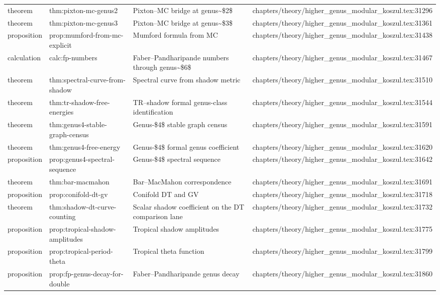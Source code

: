 \documentclass[11pt]{article}
\begin{document}
\begin{longtable}{L{0.10\textwidth}L{0.26\textwidth}L{0.42\textwidth}L{0.22\textwidth}}
theorem & thm:pixton-mc-genus2 & Pixton--MC bridge at genus\textasciitilde{}\$2\$ & chapters/theory/higher\_genus\_modular\_koszul.tex:31296\\
theorem & thm:pixton-mc-genus3 & Pixton--MC bridge at genus\textasciitilde{}\$3\$ & chapters/theory/higher\_genus\_modular\_koszul.tex:31361\\
proposition & prop:mumford-from-mc-explicit & Mumford formula from MC & chapters/theory/higher\_genus\_modular\_koszul.tex:31438\\
calculation & calc:fp-numbers & Faber--Pandharipande numbers through genus\textasciitilde{}\$6\$ & chapters/theory/higher\_genus\_modular\_koszul.tex:31467\\
theorem & thm:spectral-curve-from-shadow & Spectral curve from shadow metric & chapters/theory/higher\_genus\_modular\_koszul.tex:31510\\
theorem & thm:tr-shadow-free-energies & TR--shadow formal genus-class identification & chapters/theory/higher\_genus\_modular\_koszul.tex:31544\\
theorem & thm:genus4-stable-graph-census & Genus-\$4\$ stable graph census & chapters/theory/higher\_genus\_modular\_koszul.tex:31591\\
theorem & thm:genus4-free-energy & Genus-\$4\$ formal genus coefficient & chapters/theory/higher\_genus\_modular\_koszul.tex:31620\\
proposition & prop:genus4-spectral-sequence & Genus-\$4\$ spectral sequence & chapters/theory/higher\_genus\_modular\_koszul.tex:31642\\
theorem & thm:bar-macmahon & Bar--MacMahon correspondence & chapters/theory/higher\_genus\_modular\_koszul.tex:31691\\
proposition & prop:conifold-dt-gv & Conifold DT and GV & chapters/theory/higher\_genus\_modular\_koszul.tex:31718\\
theorem & thm:shadow-dt-curve-counting & Scalar shadow coefficient on the DT comparison lane & chapters/theory/higher\_genus\_modular\_koszul.tex:31732\\
proposition & prop:tropical-shadow-amplitudes & Tropical shadow amplitudes & chapters/theory/higher\_genus\_modular\_koszul.tex:31775\\
proposition & prop:tropical-period-theta & Tropical theta function & chapters/theory/higher\_genus\_modular\_koszul.tex:31799\\
proposition & prop:fp-genus-decay-for-double & Faber--Pandharipande genus decay & chapters/theory/higher\_genus\_modular\_koszul.tex:31860\\

\end{longtable}
\end{document}
